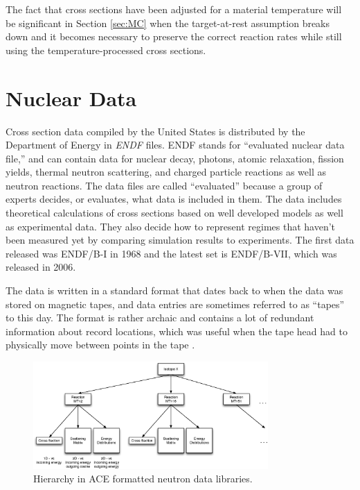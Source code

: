 The fact that cross sections have been adjusted for a material temperature will be significant in Section \ref{sec:MC} when the target-at-rest assumption breaks down and it becomes necessary to preserve the correct reaction rates while still using the temperature-processed cross sections.

\section{Nuclear Data}

Cross section data compiled by the United States is distributed by the Department of Energy in \emph{ENDF} files.  ENDF stands for ``evaluated nuclear data file,'' and can contain data for nuclear decay, photons, atomic relaxation, fission yields, thermal neutron scattering, and charged particle reactions as well as neutron reactions.  The data files are called ``evaluated'' because a group of experts decides, or evaluates, what data is included in them.  The data includes theoretical calculations of cross sections based on well developed models as well as experimental data.  They also decide how to represent regimes that haven't been measured yet by comparing simulation results to experiments.   The first data released was ENDF/B-I in 1968 and the latest set is ENDF/B-VII, which was released in 2006.  

The data is written in a standard format that dates back to when the data was stored on magnetic tapes, and data entries are sometimes referred to as ``tapes'' to this day.  The format is rather archaic and contains a lot of redundant information about record locations, which was useful when the tape head had to physically move between points in the tape \cite{endfnums}.  

\begin{figure}[h!]
  \centering
    \includegraphics[width=0.8\textwidth]{graphics/data_levels.eps}
     \caption{Hierarchy in ACE formatted neutron data libraries.  \label{data_levels}}
\end{figure}

